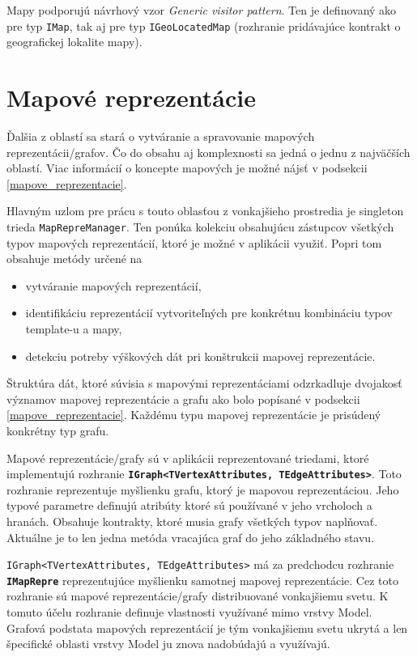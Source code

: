 Mapy podporujú návrhový vzor \textit{Generic visitor pattern}. Ten je definovaný ako pre typ \texttt{IMap}, tak aj pre typ \texttt{IGeoLocatedMap} (rozhranie pridávajúce kontrakt o geografickej lokalite mapy).

\section{Mapové reprezentácie}

Ďalšia z oblastí sa stará o vytváranie a spravovanie mapových reprezentácii/grafov. Čo do obsahu aj komplexnosti sa jedná o jednu z najväčších oblastí. Viac informácií o koncepte mapových je možné nájsť v podsekcii \ref{mapove_reprezentacie}.

Hlavným uzlom pre prácu s touto oblasťou z vonkajšieho prostredia je singleton trieda \texttt{MapRepreManager}. Ten ponúka kolekciu obsahujúcu zástupcov všetkých typov mapových reprezentácií, ktoré je možné v aplikácii využiť. Popri tom obsahuje metódy určené na 
\begin{itemize}
    \item vytváranie mapových reprezentácií,
    \item identifikáciu reprezentácií vytvoriteľných pre konkrétnu kombináciu typov template-u a mapy,
    \item detekciu potreby výškových dát pri konštrukcii mapovej reprezentácie.
\end{itemize}


\bigskip

Štruktúra dát, ktoré súvisia s mapovými reprezentáciami odzrkadluje dvojakosť významov mapovej reprezentácie a grafu ako bolo popísané v podsekcii \ref{mapove_reprezentacie}. Každému typu mapovej reprezentácie je prisúdený konkrétny typ grafu.

Mapové reprezentácie/grafy sú v aplikácii reprezentované triedami, ktoré implementujú rozhranie \textbf{\texttt{IGraph<TVertexAttributes, TEdgeAttributes>}}. Toto rozhranie reprezentuje myšlienku grafu, ktorý je mapovou reprezentáciou. Jeho typové parametre definujú atribúty ktoré sú používané v jeho vrcholoch a hranách. Obsahuje kontrakty, ktoré musia grafy všetkých typov naplňovať. Aktuálne je to len jedna metóda vracajúca graf do jeho základného stavu.

\texttt{IGraph<TVertexAttributes, TEdgeAttributes>} má za predchodcu rozhranie \textbf{\texttt{IMapRepre}} reprezentujúce myšlienku samotnej mapovej reprezentácie. Cez toto rozhranie sú mapové reprezentácie/grafy distribuované vonkajšiemu svetu. K tomuto účelu rozhranie definuje vlastnosti využívané mimo vrstvy Model. Grafová podstata mapových reprezentácií je tým vonkajšiemu svetu ukrytá a len špecifické oblasti vrstvy Model ju znova nadobúdajú a využívajú.

